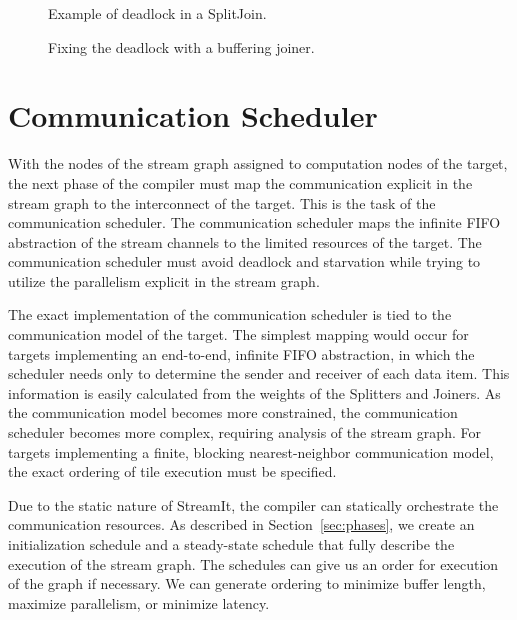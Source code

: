 \begin{figure}
\centering
{}
\caption{\protect\small Example of deadlock in a SplitJoin.
\protect\label{fig:joiner-dead}}
\vspace{36pt}
\caption{\protect\small Fixing the deadlock with a buffering joiner.
\protect\label{fig:joiner-live}}
\end{figure}

\section{Communication Scheduler}
\label{sec:communic}

With the nodes of the stream graph assigned to computation nodes of
the target, the next phase of the compiler must map the communication
explicit in the stream graph to the interconnect of the target.  This
is the task of the communication scheduler.  The communication
scheduler maps the infinite FIFO abstraction of the stream channels to
the limited resources of the target.  The communication scheduler must
avoid deadlock and starvation while trying to utilize the parallelism
explicit in the stream graph.

The exact implementation of the communication scheduler is tied to the
communication model of the target.  The simplest mapping would occur
for targets implementing an end-to-end, infinite FIFO abstraction, in
which the scheduler needs only to determine the sender and receiver of
each data item.  This information is easily calculated from the
weights of the Splitters and Joiners.  As the communication model
becomes more constrained, the communication scheduler becomes more
complex, requiring analysis of the stream graph. For targets
implementing a finite, blocking nearest-neighbor communication model,
the exact ordering of tile execution must be specified.

Due to the static nature of StreamIt, the compiler can statically
orchestrate the communication resources.  As described in
Section~\ref{sec:phases}, we create an initialization schedule and a
steady-state schedule that fully describe the execution of the stream
graph.  The schedules can give us an order for execution of the graph
if necessary.  We can generate ordering to minimize buffer length,
maximize parallelism, or minimize latency.


